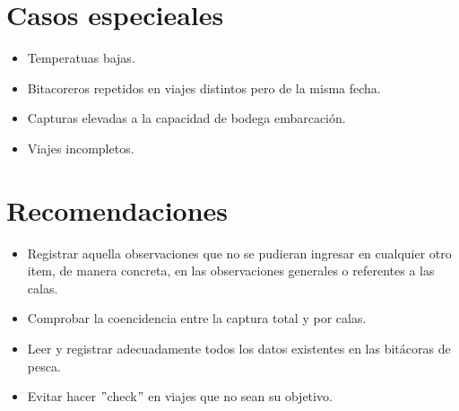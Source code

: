 \documentclass[a4paper,oneside,11pt]{book}
\begin{document}
\section{Casos especieales}
\begin{itemize}
\item{} Temperatuas bajas.
\item{} Bitacoreros repetidos en viajes distintos pero de la misma fecha.
\item{} Capturas elevadas a la capacidad de bodega embarcación.
\item{} Viajes incompletos.
\end{itemize}

\section{Recomendaciones}
\begin{itemize}
\item{} Registrar aquella observaciones que no se pudieran ingresar en cualquier otro item, de manera concreta, en las observaciones generales o referentes a las calas.
\item{} Comprobar la coencidencia entre la captura total y por calas.
\item{} Leer y registrar adecuadamente todos los datos existentes en las bitácoras de pesca.
\item{} Evitar hacer $"$check$"$ en viajes que no sean su objetivo.
\end{itemize}
\end{document}
